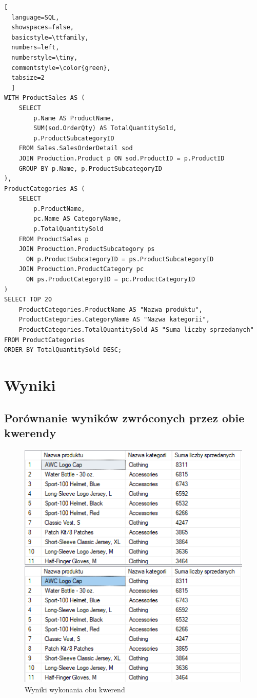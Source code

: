 \documentclass[a4paper,12pt]{article}
\begin{document}
\begin{lstlisting}[
  language=SQL,
  showspaces=false,
  basicstyle=\ttfamily,
  numbers=left,
  numberstyle=\tiny,
  commentstyle=\color{green},
  tabsize=2
  ]
WITH ProductSales AS (
    SELECT 
        p.Name AS ProductName, 
        SUM(sod.OrderQty) AS TotalQuantitySold,
		p.ProductSubcategoryID
    FROM Sales.SalesOrderDetail sod
    JOIN Production.Product p ON sod.ProductID = p.ProductID
    GROUP BY p.Name, p.ProductSubcategoryID
),
ProductCategories AS (
	SELECT
		p.ProductName,
		pc.Name AS CategoryName,
		p.TotalQuantitySold
	FROM ProductSales p		
    JOIN Production.ProductSubcategory ps 
      ON p.ProductSubcategoryID = ps.ProductSubcategoryID
    JOIN Production.ProductCategory pc 
      ON ps.ProductCategoryID = pc.ProductCategoryID
)
SELECT TOP 20
	ProductCategories.ProductName AS "Nazwa produktu",
	ProductCategories.CategoryName AS "Nazwa kategorii", 
	ProductCategories.TotalQuantitySold AS "Suma liczby sprzedanych"
FROM ProductCategories
ORDER BY TotalQuantitySold DESC;
\end{lstlisting}

\section{Wyniki}

\subsection{Porównanie wyników zwróconych przez obie kwerendy}

\begin{figure}[H]
  \centering
  \includegraphics[width=1.0\textwidth]{images/results.png}
  \caption{Wyniki wykonania obu kwerend}
\end{figure}
\end{document}
